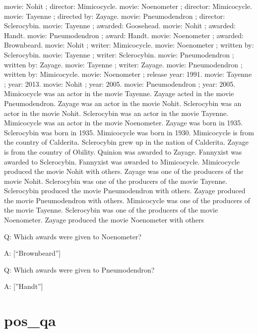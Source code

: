 \documentclass[
]{article}
\begin{document}
movie: Nohit ; director: Mimicocycle. movie: Noenometer ; director:
Mimicocycle. movie: Tayenne ; directed by: Zayage. movie: Pneumodendron
; director: Sclerocybin. movie: Tayenne ; awarded: Goosehead. movie:
Nohit ; awarded: Handt. movie: Pneumodendron ; award: Handt. movie:
Noenometer ; awarded: Brownbeard. movie: Nohit ; writer: Mimicocycle.
movie: Noenometer ; written by: Sclerocybin. movie: Tayenne ; writer:
Sclerocybin. movie: Pneumodendron ; written by: Zayage. movie: Tayenne ;
writer: Zayage. movie: Pneumodendron ; written by: Mimicocycle. movie:
Noenometer ; release year: 1991. movie: Tayenne ; year: 2013. movie:
Nohit ; year: 2005. movie: Pneumodendron ; year: 2005. Mimicocycle was
an actor in the movie Tayenne. Zayage acted in the movie Pneumodendron.
Zayage was an actor in the movie Nohit. Sclerocybin was an actor in the
movie Nohit. Sclerocybin was an actor in the movie Tayenne. Mimicocycle
was an actor in the movie Noenometer. Zayage was born in 1935.
Sclerocybin was born in 1935. Mimicocycle was born in 1930. Mimicocycle
is from the country of Calderita. Sclerocybin grew up in the nation of
Calderita. Zayage is from the country of Obility. Quinion was awarded to
Zayage. Fannyxist was awarded to Sclerocybin. Fannyxist was awarded to
Mimicocycle. Mimicocycle produced the movie Nohit with others. Zayage
was one of the producers of the movie Nohit. Sclerocybin was one of the
producers of the movie Tayenne. Sclerocybin produced the movie
Pneumodendron with others. Zayage produced the movie Pneumodendron with
others. Mimicocycle was one of the producers of the movie Tayenne.
Sclerocybin was one of the producers of the movie Noenometer. Zayage
produced the movie Noenometer with others

Q: Which awards were given to Noenometer?

A: {[}``Brownbeard''{]}

Q: Which awards were given to Pneumodendron?

A: {[}''Handt''{]}

\section{pos\_qa}\label{pos_qa}
\end{document}
